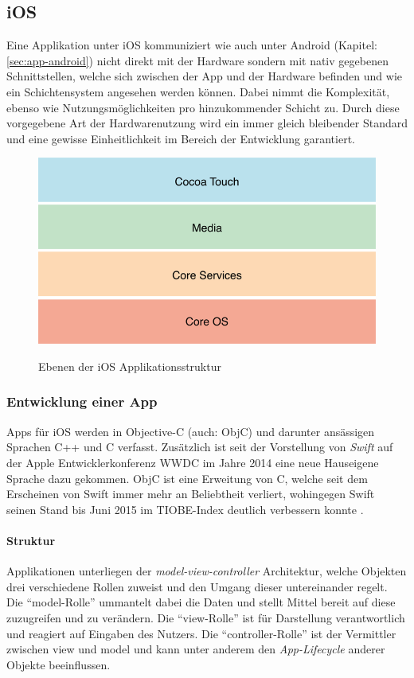 \subsection{iOS}
	Eine Applikation unter iOS kommuniziert wie auch unter Android (Kapitel:
	\ref{sec:app-android}) nicht direkt mit  der Hardware sondern mit nativ
	gegebenen Schnittstellen, welche sich zwischen der App und der Hardware
	befinden und wie ein Schichtensystem angesehen werden können. Dabei nimmt die
	Komplexität, ebenso wie Nutzungsmöglichkeiten pro hinzukommender Schicht zu.
	Durch diese vorgegebene Art der Hardwarenutzung wird ein immer gleich
	bleibender Standard und eine gewisse Einheitlichkeit im Bereich der Entwicklung
	garantiert.
	\begin{figure}[h]
		\centering
		\includegraphics[width=0.5\linewidth]{ios/media/ios-layers.png}
		\caption{Ebenen der iOS Applikationsstruktur}
		\cite{AboutiOSTech2015}
		\label{fig:marcetshare}
	\end{figure}
	
	\subsubsection{Entwicklung einer App}
		Apps für iOS werden in Objective-C (auch: ObjC) und darunter ansässigen
		Sprachen C++ und C verfasst. Zusätzlich ist seit der Vorstellung von
		\textsl{Swift} auf der Apple Entwicklerkonferenz WWDC im Jahre 2014 eine
		neue Hauseigene Sprache dazu gekommen. ObjC ist eine Erweitung von C, welche
		seit dem Erscheinen von Swift immer mehr an Beliebtheit verliert, wohingegen
		Swift seinen Stand bis Juni 2015 im TIOBE-Index deutlich verbessern
		konnte \cite{TIOBE062015}.
		\paragraph{Struktur}
			Applikationen unterliegen der \textsl{model-view-controller} Architektur,
			welche Objekten drei verschiedene Rollen zuweist und den Umgang dieser
			untereinander regelt. Die "`model-Rolle"' ummantelt dabei die Daten und stellt
			Mittel bereit auf diese zuzugreifen und zu verändern. Die "`view-Rolle"' ist
			für Darstellung verantwortlich und reagiert auf Eingaben des Nutzers. Die
			"`controller-Rolle"' ist der Vermittler zwischen view und model und kann
			unter anderem den \textsl{App-Lifecycle} anderer Objekte beeinflussen.
